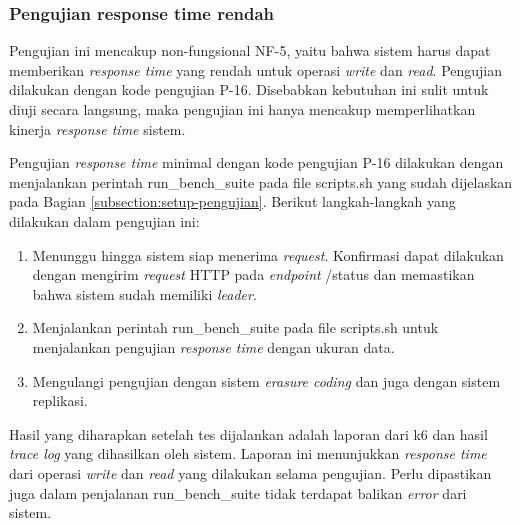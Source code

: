 \subsubsection{Pengujian response time rendah}
\label{subsubsection:pengujian-response-time-rendah}

Pengujian ini mencakup non-fungsional NF-5, yaitu bahwa sistem harus dapat memberikan \textit{response time} yang rendah untuk operasi \textit{write} dan \textit{read}. Pengujian dilakukan dengan kode pengujian P-16. Disebabkan kebutuhan ini sulit untuk diuji secara langsung, maka pengujian ini hanya mencakup memperlihatkan kinerja \textit{response time} sistem.


Pengujian \textit{response time} minimal dengan kode pengujian P-16 dilakukan dengan menjalankan perintah run\_bench\_suite pada file scripts.sh yang sudah dijelaskan pada Bagian \ref{subsection:setup-pengujian}. Berikut langkah-langkah yang dilakukan dalam pengujian ini:

\begin{enumerate}
  \item Menunggu hingga sistem siap menerima \textit{request}. Konfirmasi dapat dilakukan dengan mengirim \textit{request} HTTP pada \textit{endpoint} /status dan memastikan bahwa sistem sudah memiliki \textit{leader}.
  \item Menjalankan perintah run\_bench\_suite pada file scripts.sh untuk menjalankan pengujian \textit{response time} dengan ukuran data.
  \item Mengulangi pengujian dengan sistem \textit{erasure coding} dan juga dengan sistem replikasi.
\end{enumerate}

Hasil yang diharapkan setelah tes dijalankan adalah laporan dari k6 dan hasil \textit{trace log} yang dihasilkan oleh sistem. Laporan ini menunjukkan \textit{response time} dari operasi \textit{write} dan \textit{read} yang dilakukan selama pengujian. Perlu dipastikan juga dalam penjalanan run\_bench\_suite tidak terdapat balikan \textit{error} dari sistem.
